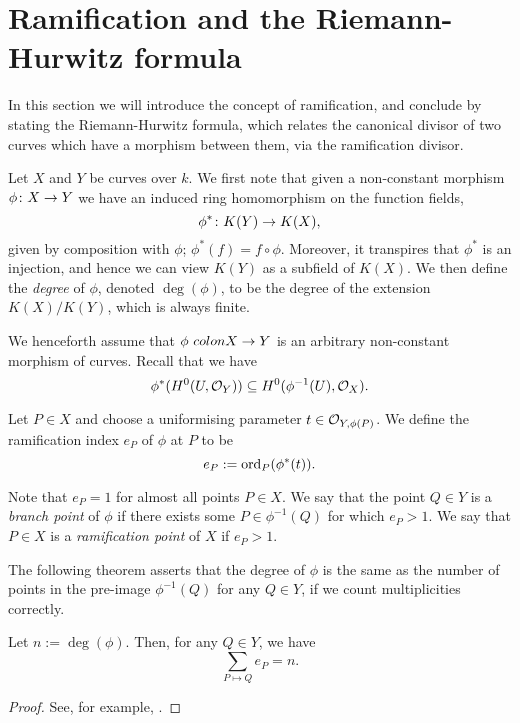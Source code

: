 \section{Ramification and the Riemann-Hurwitz formula}

In this section we will introduce the concept of ramification, and conclude by stating the Riemann-Hurwitz formula, which relates the canonical divisor of two curves which have a morphism between them, via the ramification divisor.



Let $X$ and $Y$ be curves over $k$.
We first note that given a non-constant morphism $\phi \colon X \rightarrow Y$ we have an induced ring homomorphism on the function fields,
    \[
    \phi^* \colon K(Y) \rightarrow K(X),
    \]
given by composition with $\phi$; \ie $\phi^*(f) = f \circ \phi$.
Moreover, it transpires that $\phi^*$ is an injection, and hence we can view $K(Y)$ as a subfield of $K(X)$.
We then define the \emph{degree} of $\phi$, denoted $\deg(\phi)$, to be the degree of the extension $K(X)/K(Y)$, which is always finite.

We henceforth assume that $\phi \ colon X \rightarrow Y$ is an arbitrary non-constant morphism of curves.
Recall that we have
    \[
    \phi^*(H^0(U,{\cal O}_Y)) \subseteq H^0(\phi^{-1}(U),{\cal O}_X).
    \]

    \begin{defn}
    Let $P \in X$ and choose a uniformising parameter $t \in {\cal O}_{Y,\phi(P)}$.
    We define the ramification index $e_P$ of $\phi$ at $P$ to be
        \[
        e_P := \operatorname{ord}_P(\phi^*(t)).
        \]
    \end{defn}

Note that $e_P =1$ for almost all points $P \in X$.
We say that the point $Q \in Y$ is a \emph{branch point} of $\phi$ if there exists some $P \in \phi^{-1}(Q)$ for which $e_P >1$.
We say that $P \in X$ is a \emph{ramification point} of $X$ if $e_P >1$.

The following theorem asserts that the degree of $\phi$ is the same as the number of points in the pre-image $\phi^{-1}(Q)$ for any $Q \in Y$, if we count multiplicities correctly.

    \begin{thm}
    Let $n := \deg(\phi)$.
    Then, for any $Q \in Y$, we have 
        \[
        \sum_{P \mapsto Q} e_P = n.
        \]
    \end{thm}
    \begin{proof}
    See, for example, \cite[Pg.\ 290]{liu}.
    \end{proof}

